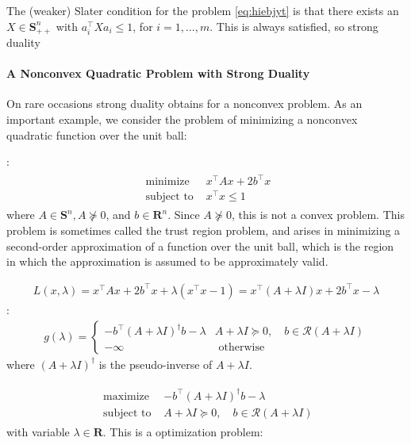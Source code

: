 \documentclass{article}
\begin{document}

The (weaker) Slater condition for the problem \cref{eq:hiebjyt} is that there exists an $X \in \mathbf{S}_{++}^{n}$ with $a_{i}^{\top} X a_{i} \leq 1$, for $i=1, \ldots, m$. This is always satisfied, so strong duality 


\paragraph{A Nonconvex Quadratic Problem with Strong Duality}
On rare occasions strong duality obtains for a nonconvex problem. As an important example, we consider the problem of minimizing a nonconvex quadratic function over the unit ball:

:
\begin{align}
\begin{array}{ll}
\text { minimize } & x^{\top} A x+2 b^{\top} x \\
\text { subject to } & x^{\top} x \leq 1
\end{array}\label{eq:hjtqrtyy}
\end{align}
where $A \in \mathbf{S}^{n}, A \nsucceq 0$, and $b \in \mathbf{R}^{n}$. Since $A \nsucceq 0$, this is not a convex problem. This problem is sometimes called the trust region problem, and arises in minimizing a second-order approximation of a function over the unit ball, which is the region in which the approximation is assumed to be approximately valid.

\begin{align*}
L(x, \lambda)=x^{\top} A x+2 b^{\top} x+\lambda\left(x^{\top} x-1\right)=x^{\top}(A+\lambda I) x+2 b^{\top} x-\lambda
\end{align*}
:
\begin{align*}
g(\lambda)= \begin{cases}-b^{\top}(A+\lambda I)^{\dagger} b-\lambda & A+\lambda I \succeq 0, \quad b \in \mathcal{R}(A+\lambda I) \\ -\infty & \text { otherwise }\end{cases}
\end{align*}
where $(A+\lambda I)^{\dagger}$ is the pseudo-inverse of $A+\lambda I$. 

\begin{align*}
\begin{array}{ll}
\text { maximize } & -b^{\top}(A+\lambda I)^{\dagger} b-\lambda \\
\text { subject to } & A+\lambda I \succeq 0, \quad b \in \mathcal{R}(A+\lambda I)
\end{array}
\end{align*}
with variable $\lambda \in \mathbf{R}$. This is a  optimization problem:
\end{document}
